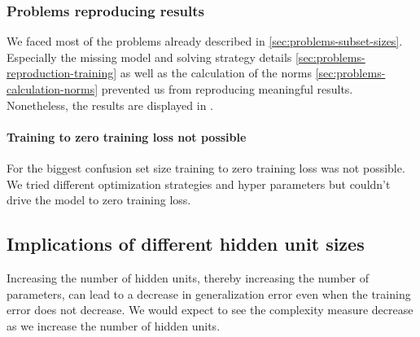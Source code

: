 \subsubsection{Problems reproducing results}
We faced most of the problems already described in \ref{sec:problems-subset-sizes}. Especially the missing model and solving strategy details \ref{sec:problems-reproduction-training} as well as the calculation of the norms \ref{sec:problems-calculation-norms} prevented us from reproducing meaningful results. Nonetheless, the results are displayed in .
%
\paragraph{Training to zero training loss not possible}
For the biggest confusion set size training to zero training loss was not possible. We tried different optimization strategies and hyper parameters but couldn't drive the model to zero training loss.
%
%
%
%
%
%
%
\subsection{Implications of different hidden unit sizes}
Increasing the number of hidden units, thereby increasing the number of parameters, can
lead to a decrease in generalization error even when the training error does not decrease.
We would expect to see the complexity measure decrease as we increase the number of
hidden units. \cite{neyshabur2017exploring} 